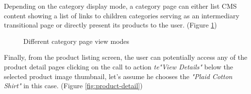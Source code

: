 Depending on the category display mode, a category page can either list CMS content showing a list of links to children categories serving as an intermediary transitional page or directly present its products to the user.
(Figure \ref{fig:category-display-modes})


\vspace{0.5cm}
\begin{figure}[H]
  \centering
  \qquad
  \caption{Different category page view modes}%
  \label{fig:category-display-modes}%
\end{figure}
\vspace{0.5cm}

Finally, from the product listing screen, the user can potentially access any of the product detail pages clicking on the call to action \textit{te"View Details"} below the selected product image thumbnail, let's assume he chooses the \textit{"Plaid Cotton Shirt"} in this case.  
(Figure \ref{fig:product-detail})

